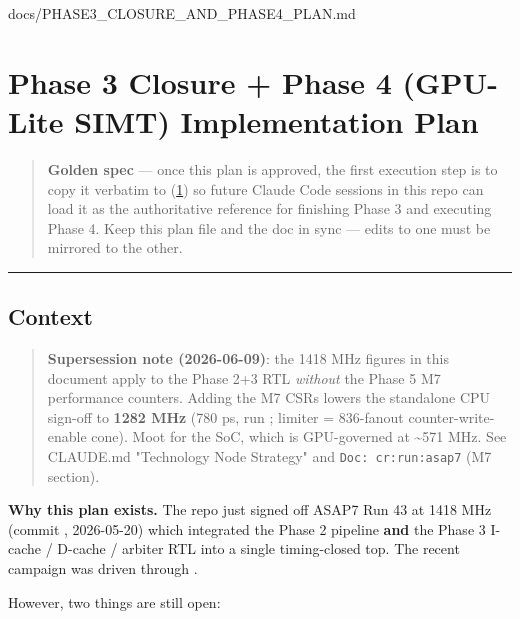\begin{relocated}{docs/PHASE3_CLOSURE_AND_PHASE4_PLAN.md}
\section{Phase 3 Closure + Phase 4 (GPU-Lite SIMT) Implementation Plan}\label{ds:ch:phase3-closure-phase4-plan}

\begin{quote}
\textbf{Golden spec} --- once this plan is approved, the first execution
step is to copy it verbatim to
 (\cref{ds:ch:phase3-closure-phase4-plan}) so future Claude Code
sessions in this repo can load it as the authoritative reference for
finishing Phase 3 and executing Phase 4. Keep this plan file and the doc
in sync --- edits to one must be mirrored to the other.
\end{quote}

\begin{center}\rule{0.5\linewidth}{0.5pt}\end{center}

\subsection{Context}\label{ds:ch:phase3-closure-phase4-plan:1-context}

\begin{quote}
\textbf{Supersession note (2026-06-09)}: the 1418 MHz figures in this
document apply to the Phase 2+3 RTL \emph{without} the Phase 5 M7
performance counters. Adding the M7 CSRs lowers the standalone CPU
sign-off to \textbf{1282 MHz} (780 ps, run
; limiter = 836-fanout
counter-write-enable cone). Moot for the SoC, which is GPU-governed at
\textasciitilde571 MHz. See CLAUDE.md "Technology Node Strategy" and
\texttt{Doc:\allowbreak{}\ cr:\allowbreak{}run:\allowbreak{}asap7} (M7
section).
\end{quote}

\textbf{Why this plan exists.} The repo just signed off ASAP7 Run 43 at
1418 MHz (commit , 2026-05-20) which integrated the Phase
2 pipeline \textbf{and} the Phase 3 I-cache / D-cache / arbiter RTL into
a single timing-closed top. The recent campaign was driven through
.

However, two things are still open:


\end{relocated}

